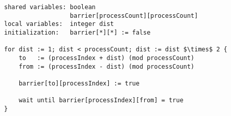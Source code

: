 \begin{lstlisting}[mathescape]
shared variables: boolean
                  barrier[processCount][processCount]
local variables:  integer dist
initialization:   barrier[*][*] := false

for dist := 1; dist < processCount; dist := dist $\times$ 2 {
	to   := (processIndex + dist) (mod processCount)
	from := (processIndex - dist) (mod processCount)
	
	barrier[to][processIndex] := true
	
	wait until barrier[processIndex][from] = true
}
\end{lstlisting}


